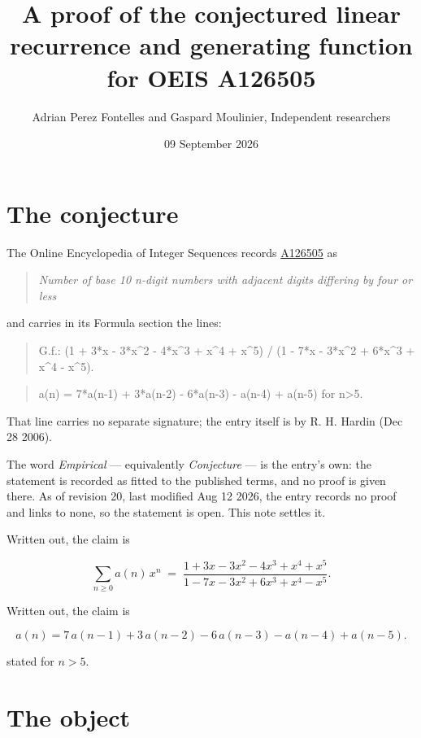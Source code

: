 \documentclass[11pt]{article}
\title{A proof of the conjectured linear recurrence and generating function for OEIS A126505}
\author{Adrian Perez Fontelles and Gaspard Moulinier, Independent researchers}
\date{09 September 2026}
\theoremstyle{definition}
\begin{document}
\maketitle
\section{The conjecture}

The Online Encyclopedia of Integer Sequences records \href{https://oeis.org/A126505}{A126505} as

\begin{quote}\itshape Number of base 10 n-digit numbers with adjacent digits differing by four or less\end{quote}

and carries in its Formula section the lines:

\begin{quote}\ttfamily G.f.: (1 + 3*x - 3*x\textasciicircum{}2 - 4*x\textasciicircum{}3 + x\textasciicircum{}4 + x\textasciicircum{}5) / (1 - 7*x - 3*x\textasciicircum{}2 + 6*x\textasciicircum{}3 + x\textasciicircum{}4 - x\textasciicircum{}5).\end{quote}

\begin{quote}\ttfamily a(n) = 7*a(n-1) + 3*a(n-2) - 6*a(n-3) - a(n-4) + a(n-5) for n>5.\end{quote}

That line carries no separate signature; the entry itself is by R. H. Hardin (Dec 28 2006).

The word {\itshape Empirical} --- equivalently {\itshape Conjecture} --- is the entry's own: the statement is recorded as fitted to the published terms, and no proof is given there. As of revision 20, last modified Aug 12 2026, the entry records no proof and links to none, so the statement is open. This note settles it.

Written out, the claim is

\[\sum_{n \ge 0} a(n)\,x^n \;=\; \frac{1 + 3x - 3x^{2} - 4x^{3} + x^{4} + x^{5}}{1 - 7x - 3x^{2} + 6x^{3} + x^{4} - x^{5}}.\]

Written out, the claim is

\[a(n) = 7\,a(n-1) + 3\,a(n-2) - 6\,a(n-3) - a(n-4) + a(n-5).\]

stated for $n > 5$.

\section{The object}
\end{document}

